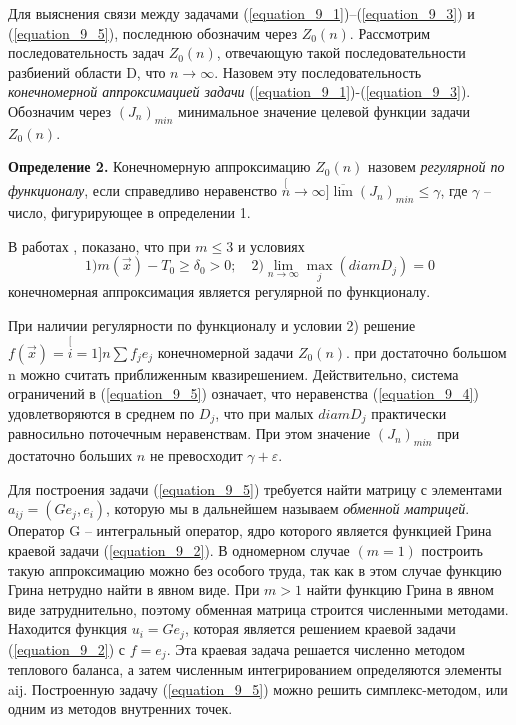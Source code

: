 Для выяснения связи между задачами (\ref{equation_9_1})--(\ref{equation_9_3}) и (\ref{equation_9_5}), последнюю обозначим через $Z_0(n)$. Рассмотрим последовательность задач $Z_0(n)$, отвечающую такой последовательности разбиений области D, что $n{\to}\infty$. Назовем эту последовательность \textit{конечномерной аппроксимацией задачи} (\ref{equation_9_1})-(\ref{equation_9_3}). Обозначим через $(J_n)_{min}$ минимальное значение целевой функции задачи $Z_0(n)$.

\textbf{Определение 2. }  Конечномерную аппроксимацию $Z_0(n)$ назовем \textit{ регулярной по функционалу}, если справедливо неравенство $\stackrel[n{\to}\infty]{}{\overline{\lim}}(J_n)_{min}\le\gamma$, где $\gamma$ -- число, фигурирующее в определении 1.

В работах \cite{literature_brusencev_2013},\cite{literature_brusencev_2012} показано, что при $m{\le}3$ и условиях
              \begin{equation} \label{equation_9_6}
              1) m(\vec x)-T_0\ge \delta_0>0;\quad 2) \lim_{n{\to}\infty}\max_j(diam D_j)=0
              \end{equation}
конечномерная аппроксимация является регулярной по функционалу.

При наличии регулярности по функционалу и условии 2) решение $f(\vec x){=}{\stackrel[i=1]{n}{\sum}}f_je_j$ конечномерной задачи $Z_0(n)$. при достаточно большом n можно считать приближенным квазирешением. Действительно, система ограничений в (\ref{equation_9_5}) означает, что неравенства (\ref{equation_9_4}) удовлетворяются в среднем по $D_j$, что при малых $diam D_j$ практически равносильно поточечным неравенствам. При этом значение $(J_n)_{min}$ при достаточно больших $n$ не превосходит $\gamma +\varepsilon$.

Для построения задачи (\ref{equation_9_5}) требуется найти матрицу с элементами $a_{ij}{=}(Ge_j,e_i)$, которую мы в дальнейшем называем   \textit{обменной матрицей}. Оператор G -- интегральный оператор, ядро которого является функцией Грина краевой задачи (\ref{equation_9_2}). В одномерном случае $(m{=}1)$ построить такую аппроксимацию можно без особого труда, так как в этом случае функцию Грина нетрудно найти в явном виде. При $m{>}1$ найти функцию Грина в явном виде затруднительно, поэтому обменная матрица строится численными методами. Находится функция $u_i{=}Ge_j$, которая является решением краевой задачи (\ref{equation_9_2}) с $f{=}e_j$. Эта краевая задача решается численно методом теплового баланса, а затем численным интегрированием определяются элементы aij. Построенную задачу (\ref{equation_9_5}) можно решить симплекс-методом, или одним из методов внутренних точек.

